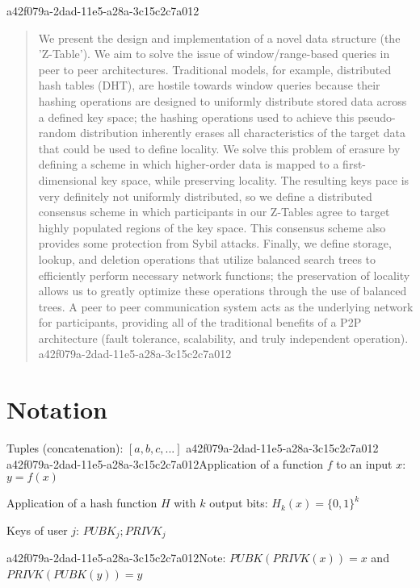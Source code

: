 \documentclass[12pt]{article}
\begin{document}
\maketitle
a42f079a-2dad-11e5-a28a-3c15c2c7a012
\begin{abstract}
We present the design and implementation of a novel data structure (the 'Z-Table'). We aim to solve the issue of window/range-based queries in peer to peer architectures. Traditional models, for example,  distributed hash tables (DHT), are hostile towards window queries because their hashing operations are designed to uniformly distribute stored data across a defined key space; the hashing operations used to achieve this pseudo-random distribution inherently erases all characteristics of the target data that could be used to define locality. We solve this problem of erasure by defining a scheme in which higher-order data is mapped to a first-dimensional key space, while preserving locality. The resulting keys pace is very definitely not uniformly distributed, so we define a distributed consensus scheme in which participants in our Z-Tables agree to target highly populated regions of the key space. This consensus scheme also provides some protection from Sybil attacks. Finally, we define storage, lookup, and deletion operations that utilize balanced search trees to efficiently perform necessary network functions; the preservation of locality allows us to greatly optimize these operations through the use of balanced trees. A peer to peer communication system acts as the underlying network for participants, providing all of the traditional benefits of a P2P architecture (fault tolerance, scalability, and truly independent operation).
a42f079a-2dad-11e5-a28a-3c15c2c7a012\end{abstract}

\section{Notation}

Tuples (concatenation): $[a,b,c,...]$
a42f079a-2dad-11e5-a28a-3c15c2c7a012
a42f079a-2dad-11e5-a28a-3c15c2c7a012Application of a function $f$ to an input $x$: $y=f(x)$

Application of a hash function $H$ with $k$ output bits: $H_{k}(x) = \{0,1\}^k$

Keys of user $j$: $ PUBK_j; PRIVK_j $

a42f079a-2dad-11e5-a28a-3c15c2c7a012Note: $PUBK(PRIVK(x)) = x$ and $PRIVK(PUBK(y)) = y$~
\end{document}
